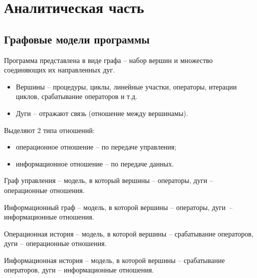 \chapter{Аналитическая часть}

\section{Графовые модели программы}

Программа представлена в виде графа -- набор вершин и множество соединяющих их направленных дуг.

\begin{itemize}
	\item Вершины -- процедуры, циклы, линейные участки, операторы, итерации циклов, срабатывание операторов и т.д.
	\item Дуги -- отражают связь (отношение между вершинамы).
\end{itemize}

Выделяют 2 типа отношений:

\begin{itemize}
	\item операционное отношение -- по передаче управления;
	\item информационное отношение -- по передаче данных.
\end{itemize}

Граф управления -- модель, в который вершины -- операторы, дуги -- операционные отношения.

Информационный граф -- модель, в которой вершины -- операторы, дуги~-- информационные отношения.

Операционная история -- модель, в которой вершины -- срабатывание
операторов, дуги -- операционные отношения.

Информационная история -- модель, в которой вершины -- срабатывание операторов, дуги -- информационные отношения.
